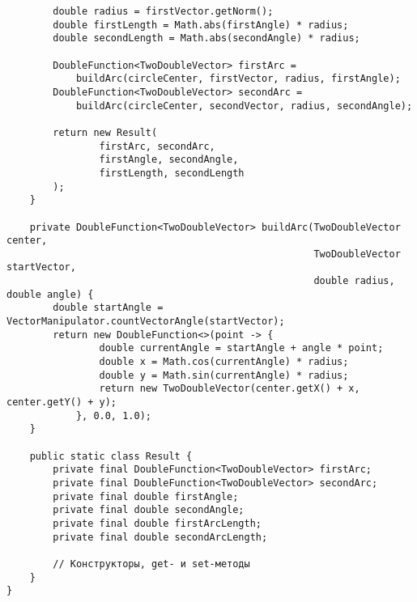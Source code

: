 \begin{verbatim}
        double radius = firstVector.getNorm();
        double firstLength = Math.abs(firstAngle) * radius;
        double secondLength = Math.abs(secondAngle) * radius;

        DoubleFunction<TwoDoubleVector> firstArc =
            buildArc(circleCenter, firstVector, radius, firstAngle);
        DoubleFunction<TwoDoubleVector> secondArc =
            buildArc(circleCenter, secondVector, radius, secondAngle);

        return new Result(
                firstArc, secondArc,
                firstAngle, secondAngle,
                firstLength, secondLength
        );
    }

    private DoubleFunction<TwoDoubleVector> buildArc(TwoDoubleVector center,
                                                     TwoDoubleVector startVector,
                                                     double radius, double angle) {
        double startAngle = VectorManipulator.countVectorAngle(startVector);
        return new DoubleFunction<>(point -> {
                double currentAngle = startAngle + angle * point;
                double x = Math.cos(currentAngle) * radius;
                double y = Math.sin(currentAngle) * radius;
                return new TwoDoubleVector(center.getX() + x, center.getY() + y);
            }, 0.0, 1.0);
    }

    public static class Result {
        private final DoubleFunction<TwoDoubleVector> firstArc;
        private final DoubleFunction<TwoDoubleVector> secondArc;
        private final double firstAngle;
        private final double secondAngle;
        private final double firstArcLength;
        private final double secondArcLength;

        // Конструкторы, get- и set-методы
    }
}
\end{verbatim}

